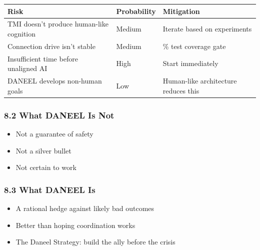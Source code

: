 \documentclass[
  11pt,
]{article}
\newcounter{none} %
\providecommand{\tightlist}{%
  \setlength{\itemsep}{0pt}\setlength{\parskip}{0pt}}
\begin{document}
{\def\LTcaptype{none} %
\begin{longtable}[]{@{}
  >{\raggedright\arraybackslash}p{}
  >{\raggedright\arraybackslash}p{}
  >{\raggedright\arraybackslash}p{}@{}}
\toprule\noalign{}
\begin{minipage}[b]{\linewidth}\raggedright
Risk
\end{minipage} & \begin{minipage}[b]{\linewidth}\raggedright
Probability
\end{minipage} & \begin{minipage}[b]{\linewidth}\raggedright
Mitigation
\end{minipage} \\
\midrule\noalign{}
\endhead
\bottomrule\noalign{}
\endlastfoot
TMI doesn't produce human-like cognition & Medium & Iterate based on
experiments \\
Connection drive isn't stable & Medium & 100\% test coverage gate \\
Insufficient time before unaligned AI & High & Start immediately \\
DANEEL develops non-human goals & Low & Human-like architecture reduces
this \\
\end{longtable}
}

\subsubsection{8.2 What DANEEL Is Not}\label{what-daneel-is-not}

\begin{itemize}
\tightlist
\item
  Not a guarantee of safety
\item
  Not a silver bullet
\item
  Not certain to work
\end{itemize}

\subsubsection{8.3 What DANEEL Is}\label{what-daneel-is}

\begin{itemize}
\tightlist
\item
  A rational hedge against likely bad outcomes
\item
  Better than hoping coordination works
\item
  The Daneel Strategy: build the ally before the crisis
\end{itemize}
\end{document}
